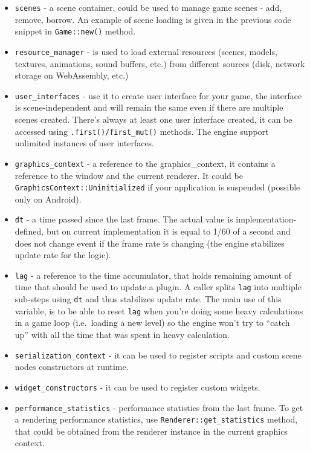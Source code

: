 \documentclass[
]{book}
\providecommand{\tightlist}{%
  \setlength{\itemsep}{0pt}\setlength{\parskip}{0pt}}
\theoremstyle{definition}
\theoremstyle{definition}
\theoremstyle{definition}
\theoremstyle{definition}
\theoremstyle{remark}
\begin{document}
\begin{itemize}
\tightlist
\item
  \texttt{scenes} - a scene container, could be used to manage game scenes - add, remove, borrow. An example of scene loading is given in the previous code snippet in \texttt{Game::new()} method.
\item
  \texttt{resource\_manager} - is used to load external resources (scenes, models, textures, animations, sound buffers, etc.) from different sources (disk, network storage on WebAssembly, etc.)
\item
  \texttt{user\_interfaces} - use it to create user interface for your game, the interface is scene-independent and will remain the same even if there are multiple scenes created. There's always at least one user interface created, it can be accessed using \texttt{.first()/first\_mut()} methods. The engine support unlimited instances of user interfaces.
\item
  \texttt{graphics\_context} - a reference to the graphics\_context, it contains a reference to the window and the current renderer. It could be \texttt{GraphicsContext::Uninitialized} if your application is suspended (possible only on Android).
\item
  \texttt{dt} - a time passed since the last frame. The actual value is implementation-defined, but on current implementation it is equal to 1/60 of a second and does not change event if the frame rate is changing (the engine stabilizes update rate for the logic).
\item
  \texttt{lag} - a reference to the time accumulator, that holds remaining amount of time that should be used to update a plugin. A caller splits \texttt{lag} into multiple sub-steps using \texttt{dt} and thus stabilizes update rate. The main use of this variable, is to be able to reset \texttt{lag} when you're doing some heavy calculations in a game loop (i.e.~loading a new level) so the engine won't try to ``catch up'' with all the time that was spent in heavy calculation.
\item
  \texttt{serialization\_context} - it can be used to register scripts and custom scene nodes constructors at runtime.
\item
  \texttt{widget\_constructors} - it can be used to register custom widgets.
\item
  \texttt{performance\_statistics} - performance statistics from the last frame. To get a rendering performance statistics, use \texttt{Renderer::get\_statistics} method, that could be obtained from the renderer instance in the current graphics context.

\end{itemize}
\end{document}
